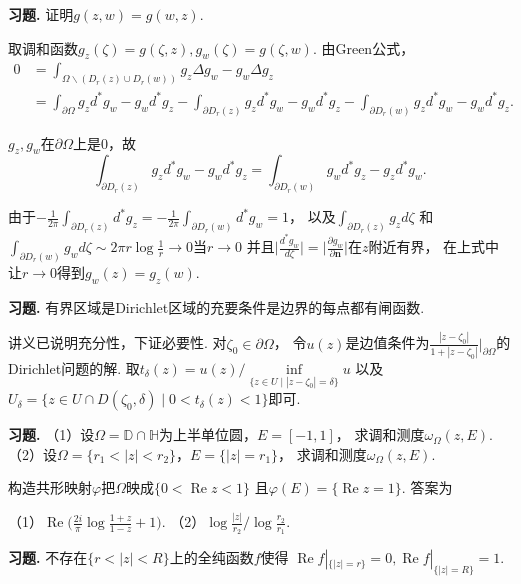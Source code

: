 \textbf{习题. } 证明$g(z,w)=g(w,z)$.
\begin{proofc}
    取调和函数$g_z(\zeta)=g(\zeta,z),g_w(\zeta)=g(\zeta,w)$. 由Green公式，
    \begin{align*}0&=\int_{\Omega\backslash(D_r(z)\cup D_r(w))}g_z\Delta g_w-g_w\Delta g_z\\
    &=\int_{\partial\Omega}g_zd^*g_w-g_wd^*g_z
    -\int_{\partial D_r(z)}g_zd^*g_w-g_wd^*g_z
    -\int_{\partial D_r(w)}g_zd^*g_w-g_wd^*g_z.\end{align*}

    $g_z,g_w$在$\partial\Omega$上是$0$，故
    $$\int_{\partial D_r(z)}g_zd^*g_w-g_wd^*g_z
    =\int_{\partial D_r(w)}g_wd^*g_z-g_zd^*g_w.$$

    由于$\displaystyle{-\frac{1}{2\pi}\int_{\partial D_r(z)}d^*g_z
    =-\frac{1}{2\pi}\int_{\partial D_r(w)}d^*g_w=1}$，
    以及$\displaystyle{\int_{\partial D_r(z)}g_zd\zeta}$
    和$\displaystyle{\int_{\partial D_r(w)}g_wd\zeta
    \sim 2\pi r\log\frac{1}{r}\rightarrow0}$当$r\rightarrow0$
    并且$\big|\frac{d^*g_w}{d\zeta}\big|
    =\big|\frac{\partial g_w}{\partial\boldsymbol{n}}\big|$在$z$附近有界，
    在上式中让$r\rightarrow0$得到$g_w(z)=g_z(w)$.
\end{proofc}

\textbf{习题. } 有界区域是Dirichlet区域的充要条件是边界的每点都有闸函数.
\begin{proofc}
    讲义已说明充分性，下证必要性. 对$\zeta_0\in\partial\Omega$，
    令$u(z)$是边值条件为$\frac{|z-\zeta_0|}{1+|z-\zeta_0|}\big|_{\partial\Omega}$的Dirichlet问题的解.
    取$t_\delta(z)=u(z)/\inf\limits_{\{z\in U\mid|z-\zeta_0|=\delta\}}u$
    以及$U_\delta=\{z\in U\cap D(\zeta_0,\delta)\mid 0<t_\delta(z)<1\}$即可.
\end{proofc}

\textbf{习题. } （1）设$\Omega=\mathbb{D}\cap\mathbb{H}$为上半单位圆，$E=[-1,1]$，
求调和测度$\omega_\Omega(z,E)$.\\
（2）设$\Omega=\{r_1<|z|<r_2\}$，$E=\{|z|=r_1\}$，
求调和测度$\omega_\Omega(z,E)$.
\begin{proofc}
    构造共形映射$\varphi$把$\Omega$映成$\{0<\operatorname{Re}z<1\}$
    且$\varphi(E)=\{\operatorname{Re}z=1\}$. 答案为

    （1）$\operatorname{Re}\big(\frac{2i}{\pi}\log\frac{1+z}{1-z}+1\big)$.
    （2）$\log\frac{|z|}{r_2}/\log\frac{r_2}{r_1}$.
\end{proofc}

\textbf{习题. } 不存在$\{r<|z|<R\}$上的全纯函数$f$使得
$\operatorname{Re}f|_{\{|z|=r\}}=0,
\operatorname{Re}f|_{\{|z|=R\}}=1$.

